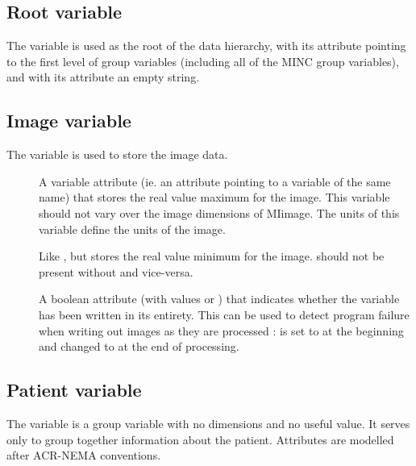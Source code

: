 \documentclass{article}
\begin{document}
\subsection{Root variable}

The variable  is used as the root of the data
hierarchy, with its  attribute pointing to the first
level of group variables (including all of the MINC group variables),
and with its  attribute an empty string.

\subsection{Image variable}

The variable  is used to store the image data. 

\begin{description}
   \item [] A variable attribute (ie. an attribute
      pointing to a variable of the same name) that stores the real
      value maximum for the image. This variable should not vary over
      the image dimensions of MIimage. The units of this variable
      define the units of the image.
   \item [] Like , but stores the
      real value minimum for the image.  should not
      be present without  and vice-versa.
   \item [] A boolean attribute (with values
       or ) that indicates whether the variable
      has been written in its entirety. This can be used to detect
      program failure when writing out images as they are processed :
       is set to  at the beginning and
      changed to  at the end of processing.
\end{description}

\subsection{Patient variable}

The variable  is a group variable with no dimensions
and no useful value. It serves only to group together information
about the patient. Attributes are modelled after ACR-NEMA conventions.
\end{document}
